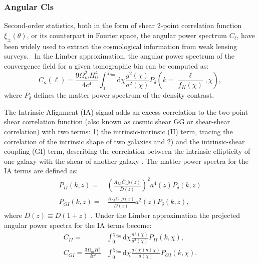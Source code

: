 \documentclass[twocolumn,twocolappendix]{aastex63}
\begin{document}
\subsubsection{Angular Cls
}
Second-order statistics, both in the form of shear 2-point correlation function $\xi_{\pm}(\theta)$, or its counterpart in Fourier space, the angular power spectrum $C_{\ell}$, have been widely used to extract the cosmological information from weak lensing surveys. \
In the Limber approximation, the angular power spectrum of the convergence field for a given tomographic bin can be computed as:
\begin{equation}
    C_{\kappa}(\ell)=\frac{9\Omega_m^2H_0^4}{4c^4}
    \int_0^{\chi_{lim}} \text{d}\chi 
    \frac{g^2(\chi)}{a^2(\chi)}P_{\delta}
    	\left( k=\frac{\ell}{f_K(\chi)},\chi \right),
\end{equation}
where $P_{\delta}$ defines the matter power spectrum of the density contrast.

The Intrinsic Alignment (IA) signal adds an excess correlation to the two-point shear correlation function (also known as cosmic shear GG or shear-shear correlation) with two terms: 1) the intrinsic-intrinsic (II) term, tracing the correlation of the intrinsic shape of two galaxies  and 2) and the intrinsic-shear coupling (GI) term, describing the correlation between the intrinsic ellipticity of one galaxy with the shear of another galaxy \citep{kilbinger2015cosmology}.
The matter power spectra for the IA terms are defined as:
\begin{align}
    P_{II}(k,z)=& \left ( \frac{A_{IA}\bar{C}_1\bar{\rho}(z)}{\bar{D}(z)} \right)^2 a^{4}(z)P_{\delta}(k,z) 
    \\
    P_{GI}(k,z)=&  \frac{A_{IA}\bar{C}_1\bar{\rho}(z)}{\bar{D}(z)} a^{2}(z)P_{\delta}(k,z),
\end{align}
where $\bar{D}(z) \equiv D(1+z)$ \citep{harnois2021cosmic}.
Under the Limber
approximation the projected angular power spectra for the IA terms become:
\begin{align}
    C_{II}=& \int_0^{\chi_{lim}} \text{d}\chi 
    \frac{n^2(\chi)}{a^2(\chi)}P_{II}(k,\chi), \\
    C_{GI}= \frac{3\Omega_m H_0^2}{2c^2} & \int_0^{\chi_{lim}} \text{d}\chi 
    \frac{g(\chi)n(\chi)}{a(\chi)}P_{GI}(k,\chi).
\end{align}
\end{document}
